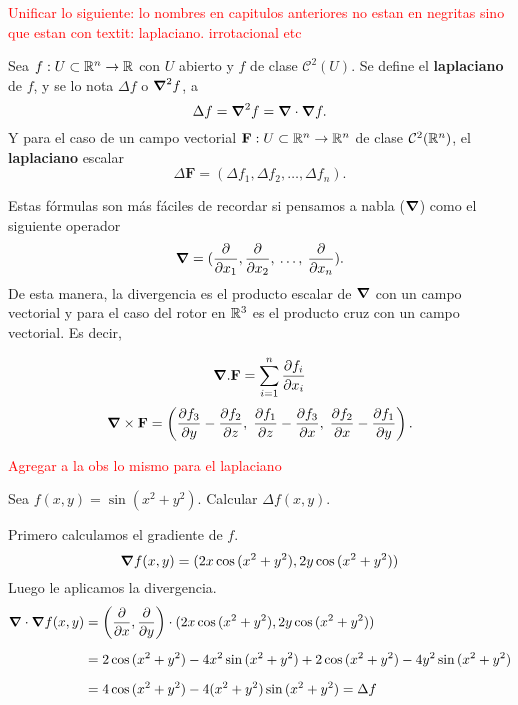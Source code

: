 \textcolor{red}{Unificar lo siguiente:  lo nombres en capitulos anteriores no estan en negritas sino que estan con textit: laplaciano. irrotacional etc }



\begin{definition}
    Sea $f:U\subset\mathbb{R}^n\to\mathbb{R}$ con  $U$ abierto y $f$ de clase $\mathcal{C}^2(U)$.  Se define el \textbf{laplaciano} de $f$, y se lo nota $\Delta f$ o $\grad^2 f$, a
    \[
        \Delta f=\grad^2f=\grad\cdot\grad f.  
    \]
    Y para el caso de un campo vectorial $\mathbf{F}:U\subset\mathbb{R}^n\to\mathbb{R}^n$ de clase $\mathcal{C}^2(\mathbb{R}^n)$, el \textbf{laplaciano} escalar
    \[
        \Delta\mathbf{F}=(\Delta f_1,\Delta f_2,\ldots,\Delta f_n). 
    \]
\end{definition}


\begin{obs}
    Estas f\'ormulas son m\'as f\'aciles de recordar si pensamos a nabla ($\grad$) como   el siguiente operador 
    \[
        \grad = (\frac{\partial}{\partial x_1},\frac{\partial}{\partial x_2},\:\ldots,\: \frac{\partial}{\partial x_n}).  
    \]
    De esta manera,   la divergencia es el producto escalar de $\grad$  con un campo vectorial  y para el caso del rotor en $\mathbb{R}^3$ es el producto cruz  con un campo vectorial. Es decir, 
    
    $$ \grad . \mathbf{F} =  \sum_{i=1}^{n} \frac{\partial f_i }{\partial x_i}  $$
     $$     \grad\times\mathbf{F}= 
                \left(\frac{\partial f_3}{\partial y}-\frac{\partial f_2}{\partial z},\;\frac{\partial f_1}{\partial z}-\frac{\partial f_3}{\partial x},\;\frac{\partial f_2}{\partial x}-\frac{\partial f_1}{\partial y}\right).$$ 
    
\end{obs}

\textcolor{red}{Agregar a la obs lo mismo para el  laplaciano }



\begin{example}
    Sea $f(x,y)=\sin{(x^2+y^2)}$. Calcular $\Delta f(x,y)$.

    Primero calculamos el gradiente de $f$.
    \[
        \grad f(x,y) = (2x\cos{(x^2+y^2)}, 2y\cos{(x^2+y^2)})
    \]
    Luego le aplicamos la divergencia.
    \begin{align*}
        \grad\cdot\grad f (x,y) &= \left(\frac{\partial}{\partial x}, \frac{\partial}{\partial y}\right)\cdot (2x\cos{(x^2+y^2)}, 2y\cos{(x^2+y^2)})\\[.2cm]
        &= 2\cos{(x^2+y^2)}-4x^2\sin{(x^2+y^2)}+2\cos{(x^2+y^2)}-4y^2\sin{(x^2+y^2)}\\[.2cm]
        &=4\cos{(x^2+y^2)}-4(x^2+y^2)\sin{(x^2+y^2)}=\Delta f
    \end{align*}
 \end{example}

